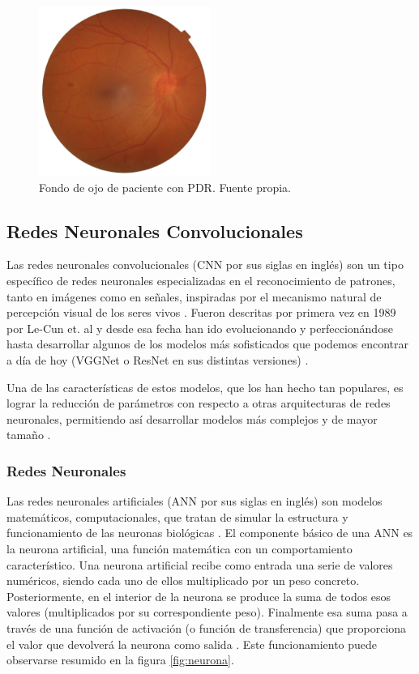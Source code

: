 \begin{itemize}[itemsep=0.25em]
    \begin{figure}[h]
        \centering
        \includegraphics[width=0.5\textwidth]{img/G4.png}
        \caption{Fondo de ojo de paciente con PDR. Fuente propia.}
        \label{fig:G4}
    \end{figure}
    
\end{itemize}

\subsection{Redes Neuronales Convolucionales}

Las redes neuronales convolucionales (CNN por sus siglas en inglés) son un tipo específico de redes neuronales especializadas en el reconocimiento de patrones, tanto en imágenes como en señales, inspiradas por el mecanismo natural de percepción visual de los seres vivos \cite{cnn:gu, cnn:ieee}. Fueron descritas por primera vez en 1989 por Le-Cun et. al \cite{cnn:antecesor} y desde esa fecha han ido evolucionando y perfeccionándose hasta desarrollar algunos de los modelos más sofisticados que podemos encontrar a día de hoy (VGGNet o ResNet en sus distintas versiones) \cite{cnn:gu}. 

Una de las características de estos modelos, que los han hecho tan populares, es lograr la reducción de parámetros con respecto a otras arquitecturas de redes neuronales, permitiendo así desarrollar modelos más complejos y de mayor tamaño \cite{cnn:ieee}.

\subsubsection{Redes Neuronales}

Las redes neuronales artificiales (ANN por sus siglas en inglés) son modelos matemáticos, computacionales, que tratan de simular la estructura y funcionamiento de las neuronas biológicas \cite{cnn:osea}. El componente básico de una ANN es la neurona artificial, una función matemática con un comportamiento característico. Una neurona artificial recibe como entrada una serie de valores numéricos, siendo cada uno de ellos multiplicado por un peso concreto. Posteriormente, en el interior de la neurona se produce la suma de todos esos valores (multiplicados por su correspondiente peso). Finalmente esa suma pasa a través de una función de activación (o función de transferencia) que proporciona el valor que devolverá la neurona como salida \cite{ann:intro}. Este funcionamiento puede observarse resumido en la figura \ref{fig:neurona}.

